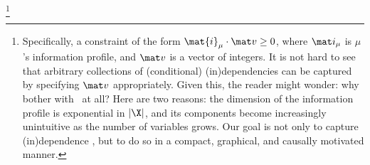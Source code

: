 {%
\unskip\footnote{
Specifically, a constraint of the form $\mat{i}_\mu \cdot \mat v \ge 0$, where $\mat i_{\mu}$ is $\mu$'s information profile, and $\mat v$ is a vector of integers.
It is not hard to see that arbitrary collections of (conditional) (in)dependencies can be captured by specifying $\mat v$ appropriately. 
%
    Given this, the reader might wonder: why bother with \scibility\ at all? 
    Here are two reasons: the dimension of the information profile is exponential in $|\X|$, and its components become increasingly unintuitive as the number of variables grows. 
    Our goal is not only to capture (in)dependence 
    \unskip, but to do so in 
    a compact, graphical, and causally motivated manner. 
}}
